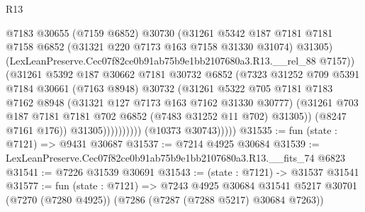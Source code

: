 \begin{lexlean}{R13}
\begin{coremodule}
                                @7183
                                @30655
                                (@7159 @6852)
                                @30730
                                (@31261
                                  @5342
                                  @187
                                  @7181
                                  @7181
                                  @7158
                                  @6852
                                  (@31321 @220 @7173 @163 @7158 @31330 @31074)
                                  @31305)
                                (LexLeanPreserve.Cec07f82ce0b91ab75b9e1bb2107680a3.R13.__rel_88
                                  @7157))
                              (@31261
                                @5392
                                @187
                                @30662
                                @7181
                                @30732
                                @6852
                                (@7323
                                  @31252
                                  @709
                                  @5391
                                  @7184
                                  @30661
                                  (@7163 @8948)
                                  @30732
                                  (@31261
                                    @5322
                                    @705
                                    @7181
                                    @7183
                                    @7162
                                    @8948
                                    (@31321 @127 @7173 @163 @7162 @31330 @30777)
                                    (@31261
                                      @703
                                      @187
                                      @7181
                                      @7181
                                      @702
                                      @6852
                                      (@7483 @31252 @11 @702)
                                      @31305))
                                  (@8247 @7161 @176))
                                @31305))))))))))
            (@10373 @30743)))))
@31535 := fun (state : @7121) => @9431 @30687
@31537 := @7214 @4925 @30684
@31539 := LexLeanPreserve.Cec07f82ce0b91ab75b9e1bb2107680a3.R13.__fits_74 @6823
@31541 := @7226 @31539 @30691
@31543 := (state : @7121) -> @31537 @31541
@31577 := fun (state : @7121) =>
  @7243
    @4925
    @30684
    @31541
    @5217
    @30701
    (@7270 (@7280 @4925))
    (@7286 (@7287 (@7288 @5217) @30684 @7263))

\end{coremodule}
\end{lexlean}
